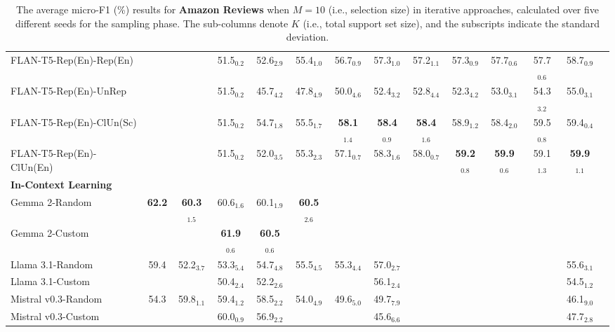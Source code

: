 \documentclass[11pt]{article}
\theoremstyle{definition}
\begin{document}
\begin{table*}[hbt]
{\begin{tabular}{l|ccccccccccccc}
FLAN-T5-Rep(En)-Rep(En) &
& & 51.5$_{0.2}$ & 52.6$_{2.9}$ & 55.4$_{1.0}$ & 56.7$_{0.9}$ & 57.3$_{1.0}$ & 57.2$_{1.1}$ & 57.3$_{0.9}$ & 57.7$_{0.6}$ & 57.7$_{0.6}$ & 58.7$_{0.9}$ & \\

FLAN-T5-Rep(En)-UnRep &
& & 51.5$_{0.2}$ & 45.7$_{4.2}$ & 47.8$_{4.9}$ & 50.0$_{4.6}$ & 52.4$_{3.2}$ & 52.8$_{4.4}$ & 52.3$_{4.2}$ & 53.0$_{3.1}$ & 54.3$_{3.2}$ & 55.0$_{3.1}$ & \\

FLAN-T5-Rep(En)-ClUn(Sc) &
& & 51.5$_{0.2}$ & 54.7$_{1.8}$ & 55.5$_{1.7}$ & \textbf{58.1}$_{1.4}$ & \textbf{58.4}$_{0.9}$ & \textbf{58.4}$_{1.6}$ & 58.9$_{1.2}$ & 58.4$_{2.0}$ & 59.5$_{0.8}$ & 59.4$_{0.4}$ & \\

FLAN-T5-Rep(En)-ClUn(En) &
& & 51.5$_{0.2}$ & 52.0$_{3.5}$ & 55.3$_{2.3}$ & 57.1$_{0.7}$ & 58.3$_{1.6}$ & 58.0$_{0.7}$ & \textbf{59.2}$_{0.8}$ & \textbf{59.9}$_{0.6}$ & 59.1$_{1.3}$ & \textbf{59.9}$_{1.1}$ & \\

\hdashline

\textbf{In-Context Learning} \\

Gemma 2-Random &
\textbf{62.2} & \textbf{60.3}$_{1.5}$ & 60.6$_{1.6}$ & 60.1$_{1.9}$ & \textbf{60.5}$_{2.6}$ & & & \\
Gemma 2-Custom &
& & \textbf{61.9}$_{0.6}$ & \textbf{60.5}$_{0.6}$ & & & \\

\hdashline[1pt/4pt]

Llama 3.1-Random &
59.4 & 52.2$_{3.7}$ & 53.3$_{5.4}$ & 54.7$_{4.8}$ & 55.5$_{4.5}$ & 55.3$_{4.4}$ & 57.0$_{2.7}$ & & & & & 55.6$_{3.1}$ \\
Llama 3.1-Custom &
& & 50.4$_{2.4}$ & 52.2$_{2.6}$ & & & 56.1$_{2.4}$ & & & & & 54.5$_{1.2}$ & \\

\hdashline[1pt/4pt]

Mistral v0.3-Random &
54.3 & 59.8$_{1.1}$ & 59.4$_{1.2}$ & 58.5$_{2.2}$ & 54.0$_{4.9}$ & 49.6$_{5.0}$ & 49.7$_{7.9}$ & & & & & 46.1$_{9.0}$ \\
Mistral v0.3-Custom &
& & 60.0$_{0.9}$ & 56.9$_{2.2}$ & & & 45.6$_{6.6}$ & & & & & 47.7$_{2.8}$ & \\

\hline

\end{tabular}
}
\caption{The average micro-F1 (\%) results for {\bf Amazon Reviews} when $M=10$ (i.e., selection size) in iterative approaches, calculated over five different seeds for the sampling phase. The sub-columns denote $K$ (i.e., total support set size), and the subscripts indicate the standard deviation.}
\label{table:amazon-complete}
\end{table*}
\end{document}
